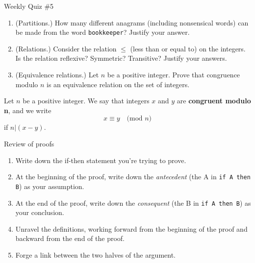 \documentclass[10pt]{beamer}
\begin{document}
\begin{frame}{Weekly Quiz \#5}

\begin{enumerate}
	\item (Partitions.) How many different anagrams (including nonsensical words) can be made from the word \texttt{bookkeeper}? Justify your answer.
	\item (Relations.) Consider the relation $\leq$ (less than or equal to) on the integers.  Is the relation reflexive? Symmetric? Transitive? Justify your answers.
	\item (Equivalence relations.) Let $n$ be a positive integer.  Prove that congruence modulo $n$ is an equivalence relation on the set of integers.
\end{enumerate}
\vfill
\begin{mygreenbox}[title=\text{Reference Material: Definition}]
Let $n$ be a positive integer.  We say that integers $x$ and $y$ are \textbf{congruent modulo n}, and we write 
\[x \equiv y \quad \text{(mod $n$)} \]
if $n | (x-y)$.
\end{mygreenbox}

	
\end{frame}


\begin{frame}[standout]
Review of proofs
\end{frame}

\begin{frame}

\begin{mybluebox}[title=Proof Template: Direct proof of an if-then (if $A$ then $B$) theorem]

\begin{enumerate}
	\item Write down the if-then statement you're trying to prove. 
	\item At the beginning of the proof, write down the \textit{antecedent} (the A in  \texttt{if A then B}) as your assumption. 
	\item  At the end of the proof, write down the \textit{consequent} (the B in  \texttt{if A then B}) as your conclusion. 
	\item Unravel the definitions, working forward from the beginning of the proof and backward from the end of the proof.
	\item Forge a link between the two halves of the argument.
\end{enumerate}
\end{mybluebox}
	
\end{frame}
\end{document}
